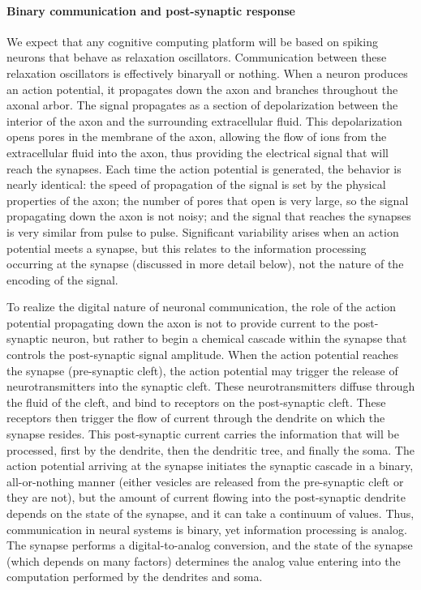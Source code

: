 \paragraph{Binary communication and post-synaptic response}
We expect that any cognitive computing platform will be based on spiking neurons that behave as relaxation oscillators. Communication between these relaxation oscillators is effectively binary\textemdash all or nothing. When a neuron produces an action potential, it propagates down the axon and branches throughout the axonal arbor. The signal propagates as a section of depolarization between the interior of the axon and the surrounding extracellular fluid. This depolarization opens pores in the membrane of the axon, allowing the flow of ions from the extracellular fluid into the axon, thus providing the electrical signal that will reach the synapses. Each time the action potential is generated, the behavior is nearly identical: the speed of propagation of the signal is set by the physical properties of the axon; the number of pores that open is very large, so the signal propagating down the axon is not noisy; and the signal that reaches the synapses is very similar from pulse to pulse. Significant variability arises when an action potential meets a synapse, but this relates to the information processing occurring at the synapse (discussed in more detail below), not the nature of the encoding of the signal. 

To realize the digital nature of neuronal communication, the role of the action potential propagating down the axon is not to provide current to the post-synaptic neuron, but rather to begin a chemical cascade within the synapse that controls the post-synaptic signal amplitude. When the action potential reaches the synapse (pre-synaptic cleft), the action potential may trigger the release of neurotransmitters into the synaptic cleft. These neurotransmitters diffuse through the fluid of the cleft, and bind to receptors on the post-synaptic cleft. These receptors then trigger the flow of current through the dendrite on which the synapse resides. This post-synaptic current carries the information that will be processed, first by the dendrite, then the dendritic tree, and finally the soma. The action potential arriving at the synapse initiates the synaptic cascade in a binary, all-or-nothing manner (either vesicles are released from the pre-synaptic cleft or they are not), but the amount of current flowing into the post-synaptic dendrite depends on the state of the synapse, and it can take a continuum of values. Thus, communication in neural systems is binary, yet information processing is analog. The synapse performs a digital-to-analog conversion, and the state of the synapse (which depends on many factors) determines the analog value entering into the computation performed by the dendrites and soma. 


